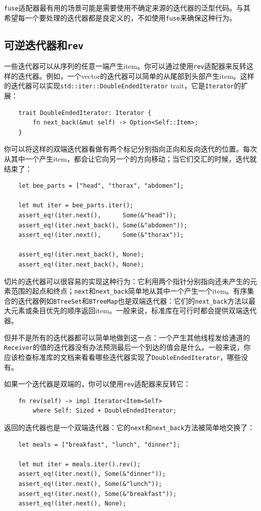 \texttt{fuse}适配器最有用的场景可能是需要使用不确定来源的迭代器的泛型代码。与其希望每一个要处理的迭代器都是良定义的，不如使用\texttt{fuse}来确保这种行为。

\subsection{可逆迭代器和\texttt{rev}}
一些迭代器可以从序列的任意一端产生item。你可以通过使用\texttt{rev}适配器来反转这样的迭代器。例如，一个vector的迭代器可以简单的从尾部到头部产生item。这样的迭代器可以实现\texttt{std::iter::DoubleEndedIterator} trait，它是\texttt{Iterator}的扩展：
\begin{verbatim}
    trait DoubleEndedIterator: Iterator {
        fn next_back(&mut self) -> Option<Self::Item>;
    }
\end{verbatim}

你可以将这样的双端迭代器看做有两个标记分别指向正向和反向迭代的位置。每次从其中一个产生item，都会让它向另一个的方向移动；当它们交汇的时候，迭代就结束了：
\begin{verbatim}
    let bee_parts = ["head", "thorax", "abdomen"];

    let mut iter = bee_parts.iter();
    assert_eq!(iter.next(),      Some(&"head"));
    assert_eq!(iter.next_back(), Some(&"abdomen"));
    assert_eq!(iter.next(),      Some(&"thorax"));

    assert_eq!(iter.next_back(), None);
    assert_eq!(iter.next_back(), None);
\end{verbatim}

切片的迭代器可以很容易的实现这种行为：它利用两个指针分别指向还未产生的元素范围的起点和终点；\texttt{next}和\texttt{next\_back}简单地从其中一个产生一个item。有序集合的迭代器例如\texttt{BTreeSet}和\texttt{BTreeMap}也是双端迭代器：它们的\texttt{next\_back}方法以最大元素或条目优先的顺序返回item。一般来说，标准库在可行时都会提供双端迭代器。

但并不是所有的迭代器都可以简单地做到这一点：一个产生其他线程发给通道的\texttt{Receiver}的值的迭代器没有办法预测最后一个到达的值会是什么。一般来说，你应该检查标准库的文档来看看哪些迭代器实现了\texttt{DoubleEndedIterator}，哪些没有。

如果一个迭代器是双端的，你可以使用\texttt{rev}适配器来反转它：
\begin{verbatim}
    fn rev(self) -> impl Iterator<Item=Self>
        where Self: Sized + DoubleEndedIterator;
\end{verbatim}

返回的迭代器也是一个双端迭代器：它的\texttt{next}和\texttt{next\_back}方法被简单地交换了：
\begin{verbatim}
    let meals = ["breakfast", "lunch", "dinner"];

    let mut iter = meals.iter().rev();
    assert_eq!(iter.next(), Some(&"dinner"));
    assert_eq!(iter.next(), Some(&"lunch"));
    assert_eq!(iter.next(), Some(&"breakfast"));
    assert_eq!(iter.next(), None);
\end{verbatim}

